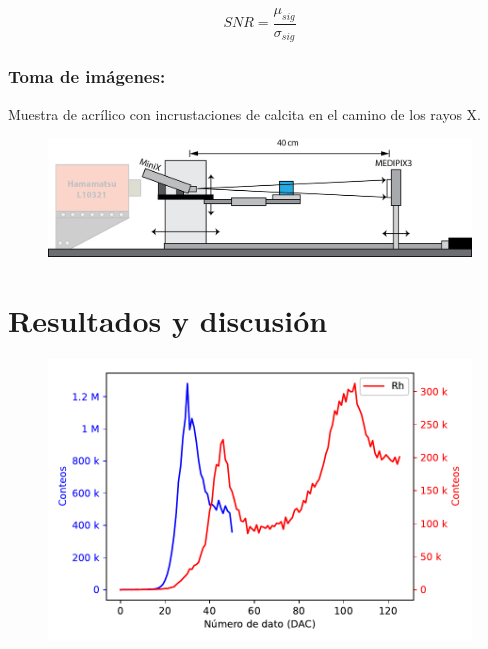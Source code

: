 \documentclass{sciposter}
\begin{document}
\begin{multicols}{3}
	\begin{equation}
	SNR=\frac{\mu_{sig}}{\sigma_{sig}}
	\end{equation}
	
	\subsubsection{Toma de imágenes:}
	Muestra de acrílico con incrustaciones de calcita en el camino de los rayos X.
	
	\begin{figure}[h]
		\centering
		\includegraphics[width = 0.7\linewidth]{Figuras/Ag_Ima.png}
	\end{figure}

\section{Resultados y discusión}
	\begin{figure}[h]
		\centering
		\includegraphics[width = 0.7\linewidth]{Figuras/CalibracionE.pdf}
	\end{figure}
	

\end{multicols}
\end{document}
